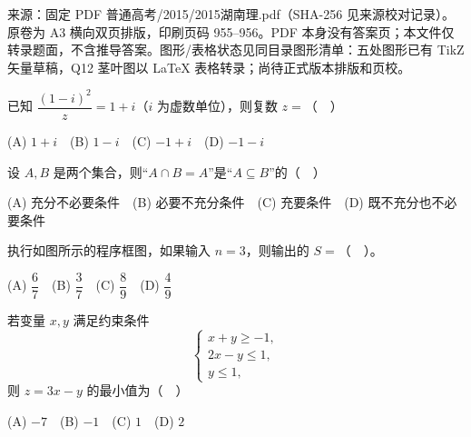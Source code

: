 
\begin{gktip}
来源：固定 PDF 普通高考/2015/2015湖南理.pdf（SHA-256 见来源校对记录）。原卷为 A3 横向双页排版，印刷页码 955–956。PDF 本身没有答案页；本文件仅转录题面，不含推导答案。图形/表格状态见同目录图形清单：五处图形已有 TikZ 矢量草稿，Q12 茎叶图以 LaTeX 表格转录；尚待正式版本排版和页校。
\end{gktip}


\begin{question}

已知 \(\dfrac{(1-i)^2}{z}=1+i\)（\(i\) 为虚数单位），则复数 \(z=\)（　）

(A) \(1+i\)　(B) \(1-i\)　(C) \(-1+i\)　(D) \(-1-i\)

\end{question}
\begin{question}

设 \(A,B\) 是两个集合，则“\(A\cap B=A\)”是“\(A\subseteq B\)”的（　）

(A) 充分不必要条件　(B) 必要不充分条件　(C) 充要条件　(D) 既不充分也不必要条件

\Needspace{0.4\textheight}
\end{question}
\begin{question}

执行如图所示的程序框图，如果输入 \(n=3\)，则输出的 \(S=\)（　）。
\nopagebreak[4]
\begin{center}\end{center}
\nopagebreak[4]
(A) \(\dfrac67\)　(B) \(\dfrac37\)　(C) \(\dfrac89\)　(D) \(\dfrac49\)

\end{question}
\begin{question}

若变量 \(x,y\) 满足约束条件
\nopagebreak[4]
\[
\begin{cases}
x+y\geqslant -1,\\
2x-y\leqslant 1,\\
y\leqslant 1,
\end{cases}
\]
则 \(z=3x-y\) 的最小值为（　）

(A) \(-7\)　(B) \(-1\)　(C) \(1\)　(D) \(2\)

\end{question}
